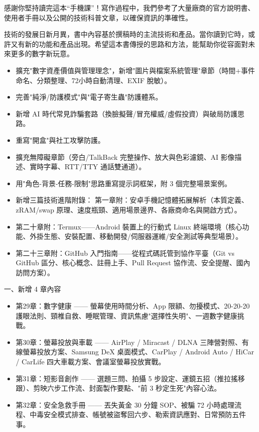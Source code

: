 
感謝你堅持讀完這本“手機課”！寫作過程中，我們參考了大量廠商的官方說明書、使用者手冊以及公開的技術科普文章，以確保資訊的準確性。

技術的發展日新月異，書中內容基於撰稿時的主流技術和產品。當你讀到它時，或許又有新的功能和產品出現。希望這本書傳授的思路和方法，能幫助你從容面對未來更多的數字新玩意。


\begin{itemize}
  \item 擴充"數字資產價值與管理理念"，新增"圖片與檔案系統管理"章節（時間+事件命名、分類整理、72小時自動清理、EXIF 脫敏）。
  \item 完善"純淨/防護模式"與"電子寄生蟲"防護體系。
  \item 新增 AI 時代常見詐騙套路（換臉擬聲/冒充權威/虛假投資）與破局防護思路。
  \item 重寫"開盒"與社工攻擊防護。
  \item 擴充無障礙章節（旁白/TalkBack 完整操作、放大與色彩濾鏡、AI 影像描述、實時字幕、RTT/TTY 通話雙通道）。
  \item 用"角色-背景-任務-限制"思路重寫提示詞框架，附 3 個完整場景案例。
  \item 新增三篇技術進階附錄： 第一章附：安卓手機記憶體拓展解析（本質定義、zRAM/swap 原理、速度瓶頸、適用場景邊界、各廠商命名與開啟方式）。
  \item 第二十章附：Termux——Android 裝置上的行動式 Linux 終端環境（核心功能、外掛生態、安裝配置、移動開發/伺服器運維/安全測試等典型場景）。
  \item 第二十三章附：GitHub 入門指南——從程式碼託管到協作平臺（Git vs GitHub 區分、核心概念、註冊上手、Pull Request 協作流、安全提醒、國內訪問方案）。
\end{itemize}


一、新增 4 章內容

\begin{itemize}
  \item 第29章：數字健康 —— 螢幕使用時間分析、App 限額、勿擾模式、20-20-20 護眼法則、頸椎自救、睡眠管理、資訊焦慮"選擇性失明"、一週數字健康挑戰。
  \item 第30章：螢幕投放與車載 —— AirPlay / Miracast / DLNA 三陣營對照、有線螢幕投放方案、Samsung DeX 桌面模式、CarPlay / Android Auto / HiCar / CarLife 四大車載方案、會議室螢幕投放實戰。
  \item 第31章：短影音創作 —— 選題三問、拍攝 5 步設定、運鏡五招（推拉搖移跟）、剪映六步工作流、封面製作要點、"前 3 秒定生死"內容心法。
  \item 第32章：安全急救手冊 —— 丟失黃金 30 分鐘 SOP、被騙 72 小時處理流程、中毒安全模式排查、帳號被盜奪回六步、勒索資訊應對、日常預防五件事。
\end{itemize}


